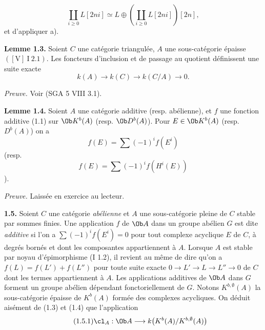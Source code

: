 \[
 \coprod_{i\geq0} L[2ni]\simeq
 L\oplus\left(\coprod_{i\geq0}L[2ni]\right)[2n],
\]
et d'appliquer a).

\textbf{Lemme 1.3.} Soient \(C\) une catégorie triangulée, \(A\) une sous-catégorie épaisse \(([\mathrm V]\ \mathrm I\ 2.1)\). Les foncteurs d'inclusion et de passage au quotient définissent une suite exacte
\[
 k(A)\longrightarrow k(C)\longrightarrow k(C/A)\longrightarrow 0.
\]

\emph{Preuve.} Voir (SGA 5 VIII 3.1).

\textbf{Lemme 1.4.} Soient \(A\) une catégorie additive (resp. abélienne), et \(f\) une fonction additive (1.1) sur \(\Ob K^b(A)\) (resp. \(\Ob D^b(A)\)). Pour \(E\in\Ob K^b(A)\) (resp. \(D^b(A)\)) on a
\[
 f(E)=\sum(-1)^i f(E^i)
\]
(resp.
\[
 f(E)=\sum(-1)^i f(H^i(E))
\]).

\emph{Preuve.} Laissée en exercice au lecteur.

\textbf{1.5.} Soient \(C\) une catégorie \emph{abélienne} et \(A\) une sous-catégorie pleine de \(C\) stable par sommes finies. Une application \(f\) de \(\Ob A\) dans un groupe abélien \(G\) est dite \emph{additive} si l'on a \(\sum(-1)^i f(E^i)=0\) pour tout complexe acyclique \(E\) de \(C\), à degrés bornés et dont les composantes appartiennent à \(A\). Lorsque \(A\) est stable par noyau d'épimorphisme (I 1.2), il revient au même de dire qu'on a \(f(L)=f(L')+f(L'')\) pour toute suite exacte \(0\longrightarrow L'\longrightarrow L\longrightarrow L''\longrightarrow0\) de \(C\) dont les termes appartiennent à \(A\). Les applications additives de \(\Ob A\) dans \(G\) forment un groupe abélien dépendant fonctoriellement de \(G\). Notons \(K^{b,\emptyset}(A)\) la sous-catégorie épaisse de \(K^b(A)\) formée des complexes acycliques. On déduit aisément de (1.3) et (1.4) que l'application
\begin{equation}\tag{1.5.1}
 \cl_A:\Ob A\longrightarrow k\bigl(K^b(A)/K^{b,\emptyset}(A)\bigr)
\end{equation}
